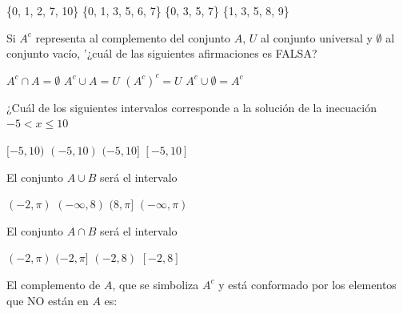 \documentclass[10pt,letterpaper,addpoints]{exam}
\begin{document}
\begin{multicols}{2}
\begin{questions}
\begin{choices}
\begin{multicols}{2}
\choice \{0, 1, 2, 7, 10\}
\CorrectChoice \{0, 1, 3, 5, 6, 7\}
\choice \{0, 3, 5, 7\}
\choice \{1, 3, 5, 8, 9\}
\end{multicols}
\end{choices}
\question Si $A^{c}$ representa al complemento del conjunto $A$, $U$ al conjunto universal y $\emptyset$ al conjunto vacío, '¿cuál de las siguientes afirmaciones es FALSA?
\begin{choices}
\begin{multicols}{2}
\choice $A^{c}\cap A=\emptyset$
\choice $A^{c}\cup A=U$
\CorrectChoice $(A^{c})^{c}=U$
\choice $A^{c}\cup \emptyset=A^{c}$
\end{multicols}
\end{choices}
\question ¿Cuál de los siguientes intervalos corresponde a la solución de la inecuación $-5<x\leq 10$
\begin{choices}
\begin{multicols}{2}
\choice $[-5,10)$ 
\choice $(-5,10)$
\CorrectChoice $(-5,10]$
\choice $[-5,10]$
\end{multicols}
\end{choices}
\uplevel{Dados los conjuntos $A=(-2,8)$ y $B=(-\infty,\pi]$, responda las preguntas \ref{firstq1}--\ref{lastq1}}
\question \label{firstq1} El conjunto $A\cup B$ será el intervalo
\begin{choices}
\begin{multicols}{2}
 \choice $(-2,\pi)$
 \CorrectChoice $(-\infty,8)$
 \choice $(8,\pi]$
 \choice $(-\infty,\pi)$
\end{multicols}
\end{choices}
\question El conjunto $A \cap B $ será el intervalo
\begin{choices}
\begin{multicols}{2}
 \choice $(-2,\pi)$
 \CorrectChoice $(-2,\pi]$
 \choice $(-2,8)$
 \choice $[-2,8]$
\end{multicols}
\end{choices}
\question \label{lastq1} El complemento de $A$, que se simboliza $A^{c}$ y está conformado por los elementos que NO están en $A$ es:


\end{questions}
\end{multicols}
\end{document}
